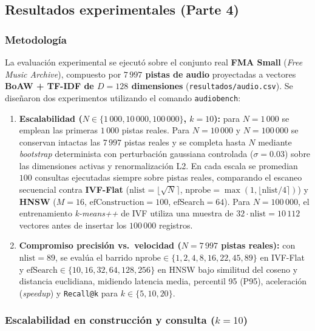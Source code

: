 \documentclass[11pt,a4paper]{article}
\begin{document}
\subsection{Resultados experimentales (Parte 4)}
\label{sec:exp-audio}

\subsubsection{Metodología}

La evaluación experimental se ejecutó sobre el conjunto real \textbf{FMA Small} (\emph{Free Music Archive}), compuesto por \textbf{$7\,997$ pistas de audio} proyectadas a vectores \textbf{BoAW + TF-IDF de $D = 128$ dimensiones} (\texttt{resultados/audio.csv}). Se diseñaron dos experimentos utilizando el comando \texttt{audiobench}:

\begin{enumerate}
  \item \textbf{Escalabilidad ($N \in \{1\,000, 10\,000, 100\,000\}$, $k = 10$):} para $N = 1\,000$ se emplean las primeras $1\,000$ pistas reales. Para $N = 10\,000$ y $N = 100\,000$ se conservan intactas las $7\,997$ pistas reales y se completa hasta $N$ mediante \emph{bootstrap} determinista con perturbación gaussiana controlada ($\sigma = 0.03$) sobre las dimensiones activas y renormalización L2. En cada escala se promedian $100$ consultas ejecutadas siempre sobre pistas reales, comparando el escaneo secuencial contra \textbf{IVF-Flat} ($\text{nlist} = \lfloor\sqrt{N}\rceil$, $\text{nprobe} = \max(1, \lfloor\text{nlist}/4\rceil)$) y \textbf{HNSW} ($M = 16$, $\text{efConstruction} = 100$, $\text{efSearch} = 64$). Para $N = 100\,000$, el entrenamiento \emph{k-means++} de IVF utiliza una muestra de $32 \cdot \text{nlist} = 10\,112$ vectores antes de insertar los $100\,000$ registros.
  \item \textbf{Compromiso precisión vs.\ velocidad ($N = 7\,997$ pistas reales):} con $\text{nlist} = 89$, se evalúa el barrido $\text{nprobe} \in \{1, 2, 4, 8, 16, 22, 45, 89\}$ en IVF-Flat y $\text{efSearch} \in \{10, 16, 32, 64, 128, 256\}$ en HNSW bajo similitud del coseno y distancia euclidiana, midiendo latencia media, percentil 95 (P95), aceleración (\emph{speedup}) y \texttt{Recall@k} para $k \in \{5, 10, 20\}$.
\end{enumerate}

\subsubsection{Escalabilidad en construcción y consulta ($k = 10$)}
\end{document}
